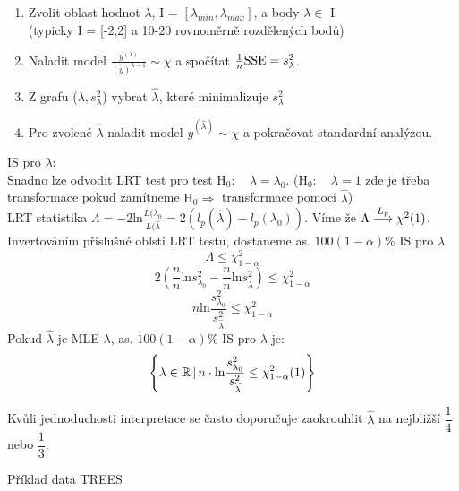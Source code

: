 \begin{enumerate}
\item Zvolit oblast hodnot $ \lambda $, I = $ [ \lambda_{min}, \lambda_{max} ] $, a body $ \lambda \in $ I \\
(typicky I = [-2,2] a 10-20 rovnoměrně rozdělených bodů)
\item Naladit model $ \frac{y^{(\lambda)}}{( \dot{y})^{\lambda-1}} \sim \chi $ a spočítat $ \frac{1}{n}\mathrm{SSE} = s_{\lambda}^{2} $.
\item Z grafu ($ \lambda , s_{\lambda}^{2} $) vybrat $ \widehat{\lambda} $, které minimalizuje $ s_{\lambda}^{2} $
\item Pro zvolené $ \widehat{\lambda} $ naladit model $ y^{(\widehat{\lambda})} \sim \chi $ a pokračovat standardní analýzou.
\end{enumerate}
IS pro $ \lambda $: \\
Snadno lze odvodit LRT test pro test $ \text{H}_0 : \quad \lambda = \lambda_0 $. ($ \text{H}_0 : \quad \lambda = 1 $ zde je třeba transformace pokud zamítneme $ \text{H}_0 \Rightarrow $ transformace pomocí $ \widehat{\lambda} $) \\
LRT statistika $ \Lambda = -2 \text{ln} \frac{L(\lambda_0}{L(\widehat{\lambda}} = 2 ( l_p(\widehat{\lambda}) - l_p(\lambda_0)) $. Víme že $ \Lambda \stackrel{L_p}{\longrightarrow} \chi^2(1)  $. Invertováním příslušné oblsti LRT testu, dostaneme as. $ 100(1-\alpha)\% $ IS pro $ \lambda $
$$
  \Lambda \leq \chi^2_{1-\alpha}
$$
$$
 2( \frac{n}{n}\text{ln}s^2_{\lambda_0} - \frac{n}{n}\text{ln}s^2_{\widehat{\lambda}}  ) \leq \chi^2_{1-\alpha}
$$
$$
  n \text{ln}\dfrac{s^2_{\lambda_0}}{s^2_{\widehat{\lambda}}} \leq \chi^2_{1-\alpha}
$$
Pokud $ \widehat{\lambda} $ je MLE $ \lambda $, as. $ 100(1-\alpha)\% $ IS  pro $ \lambda $ je:
$$
 \left\{ \lambda \in \mathbb{R} \, \vert \, n \cdot \text{ln}\dfrac{s^2_{\lambda_0}}{s^2_{\widehat{\lambda}}} \leq \chi^2_{1-\alpha}(1) \right\} 
$$
\begin{remark}
 Kvůli jednoduchosti interpretace se často doporučuje zaokrouhlit $ \widehat{\lambda} $ na nejbližší $ \dfrac{1}{4} $ nebo $ \dfrac{1}{3} $.
\end{remark}
Příklad data TREES
